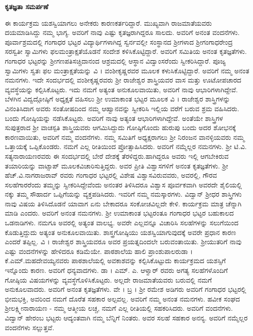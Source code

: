 {{\large \textbf{ಕೃತಜ್ಞತಾ ಸಮರ್ಪಣೆ \enginline{-}}}

ಈ ಕಾರ್ಯಕ್ರಮ ಯಶಸ್ವಿಯಾಗಲು  ಅನೇಕರು ಕಾರಣಕರ್ತರಿದ್ದಾರೆ. ಮುಖ್ಯವಾಗಿ ರಾಜಮಾತೆಯವರು ದಯಮಾಡಿಸಿದ್ದು ನಮ್ಮ ಭಾಗ್ಯ. ಅವರಿಗೆ ನಾವು ಎಷ್ಟು ಕೃತಜ್ಞರಾಗಿದ್ದರೂ ಸಾಲದು. ಅವರಿಗೆ ಅನಂತ ವಂದನೆಗಳು.
ಪೂರ್ವಾಶ್ರಮದಲ್ಲಿ ಗಂಗಾಧರ ಭಟ್ಟರ ವಿದ್ಯಾರ್ಥಿಗಳಾಗಿದ್ದ ಸ್ವರ್ನವಲ್ಲೀ ಸಂಸ್ಥಾನದ ಶ್ರೀಗಳಾದ \hbox{ಶ್ರೀಗಂಗಾಧರೇಂದ್ರ} ಸರಸ್ವತೀ ಸ್ವಾಮಿಗಳು ಫಲಮಂತ್ರಾಕ್ಷತೆಯೊಡನೆ ಸಂದೇಶ ಕಳಿಸಿಕೊಟ್ಟಿದ್ದಾರೆ. ಅವರಿಗೆ ಸಮಿತಿಯ ಅನಂತ ಕೃತಜ್ಞತೆಗಳು. ಗಂಗಾಧರ ಭಟ್ಟರನ್ನು ಶ್ರೀಗಣಪತಿಸಚ್ಚಿದಾನಂದ ಆಶ್ರಮ\-ದಲ್ಲಿ ಆಸ್ಥಾನ ವಿದ್ವಾಂಸರೆಂದು ಸ್ವೀಕರಿಸಿದ್ದಾರೆ. ಪೂಜ್ಯ ಸ್ವಾಮಿಗಳು ಸ್ವತಃ ಫಲ ಮಂತ್ರಾಕ್ಷತೆಯನ್ನು ವಿ । ವಂಶೀಕೃಷ್ಣರವರ ಮೂಲಕ ಕಳುಸಿಕೊಟ್ಟಿದ್ದಾರೆ. ಅವರಿಗೆ ನಮ್ಮ ಅನಂತ ನಮನಗಳು. ಇದೇ ಸಂದರ್ಭದಲ್ಲಿ ವಂಶೀಕೃಷ್ಣರವರು  ಶ್ರೀ ರಾಜೇಶ್ವರ ಶಾಸ್ತ್ರಿಯವರ ವಾಸ ಮತ್ತು ಊಟೋಪಚಾರದ ವ್ಯವಸ್ಥೆಯನ್ನು ಕಲ್ಪಿಸಿಕೊಟ್ಟರು. ಇದು ನಮಗೆ ಅತ್ಯಂತ ಅನುಕೂಲ\-ವಾಯಿತು, ಅವರಿಗೆ ನಾವು ಆಭಾರಿಗಳಾಗಿದ್ದೇವೆ. ಬೆಳಗಿನ ವಿದ್ವದ್ಗೋಷ್ಠಿಗೆ ಅಧ್ಯಕ್ಷತೆ ವಹಿಸಲು  ಶ್ರೀ ಉಮಾಕಾಂತ ಭಟ್ಟರ ಮೂಲಕ ವಿ । ರಾಜೇಶ್ವರ ಶಾಸ್ತ್ರಿಗಳನ್ನು ವಿನಂತಿಸಿದಾಗ ಅವರು ಸಂತೋಷದಿಂದ ನಮ್ಮ ಆಹ್ವಾನವನ್ನು ಸ್ವೀಕರಿಸಿ ಇಲ್ಲಿಯ ವರೆಗೆ ಬರುವ ಶ್ರಮ ವಹಿಸಿದರು. ಬಂದು ಗೋಷ್ಠಿಯನ್ನು ನಡೆಸಿಕೊಟ್ಟರು. ಅವರಿಗೆ ನಾವು ಅತ್ಯಂತ ಆಭಾರಿಗಳಾಗಿದ್ದೇವೆ. ಅಂತೆಯೇ ಶಾಸ್ತ್ರಿಗಳ ಸುಪುತ್ರರಾದ ಶ್ರೀ ವಾಚಸ್ಪತಿ ಶಾಸ್ತ್ರಿಯವರು  ಆಗಮಿಸಿದ್ದುದು ಗೋಷ್ಠಿಗೊಂದು  ಹುರುಪು ಬಂದು ಅದರ  \hbox{ಶೋಭನಕ್ಕೆ} ಕಾರಣವಾಯಿತು, ಅವರಿಗೆ ನಮ್ಮ ವಂದನೆಗಳು. ನಮ್ಮ ಸಮಿತಿಗೆ ಅಧ್ಯಕ್ಷರಾಗಲು ಶ್ರೀ ನಿರಂಜನ ವಾನಳ್ಳಿಯವರು ನಮ್ಮ ಒತ್ತಾಯಕ್ಕೆ ಒಪ್ಪಿಕೊಂಡರು.  ನಮಗೆ ಎಲ್ಲ ರೀತಿಯಿಂದ ಪ್ರೋತ್ಸಾಹಿಸಿದರು. ಅವರಿಗೆ ನಮ್ಮೆಲ್ಲರ ನಮನಗಳು. ಶ್ರೀ ಟಿ.ವಿ. ಸತ್ಯನಾರಾಯಣರವರು ಈ  ಸಂದರ್ಭದಲ್ಲಿ ಬೇರೆ ದೇಶಕ್ಕೆ ತೆರಳಿದ್ದರು.\break ಹಾಗಿದ್ದರೂ ಅವರು ಇಲ್ಲಿ ಆಗಬೇಕಿರುವ ತಯಾರಿಯನ್ನು ವಾಟ್ಸಾಪ್ ಮೂಲಕ\break ವಿಚಾರಿಸುತ್ತಿದ್ದರು. ಅವರ ಪ್ರೀತಿ ವಿಶ್ವಾಸಗಳಿಗೆ ಅನಂತ ಕೃತಜ್ಞತೆಗಳು. ಶ್ರೀ \hbox{ಹೆಚ್}.ವಿ.\-ನಾಗರಾಜರಾವ್ ರವರು ಗಂಗಾಧರ ಭಟ್ಟರಲ್ಲಿ ವಿಶೇಷ ವಿಶ್ವಾಸವಿರುವವರು, ಅವರಲ್ಲಿ, ಗೌರವ ಸಲಹೆಗಾರರೆಂದು ತಮ್ಮನ್ನು  ಸ್ವೀಕರಿಸಿದ್ದೇವೆಂದು ಅನಂತರ \hbox{ತಿಳಿಸಿದರೂ} ವಿಶ್ವಾಸ ಪೂರ್ವಕವಾಗಿ ಅವರದೇ ಶೈಲಿಯಲ್ಲಿ ನಕ್ಕು ತಮ್ಮ ಸೌಹಾರ್ದ ಒಪ್ಪಿಗೆಯನ್ನು ವ್ಯಕ್ತಪಡಿಸಿದರು. ಇವರಿಗೆ ನಮ್ಮ ನಮಸ್ಕಾರಗಳು. ವಿದ್ವಾನ್ ಶ್ರೀಧರ ಶಾಸ್ತ್ರಿಗಳು ನಾವು ವಿಷಯ ತಿಳಿಸಿದೊಡನೆ ಯಾವಾಗ ಏನು ಬೇಕಾದರೂ ಸಂಕೋಚವಿಲ್ಲದೇ ಕೇಳಿ. ಕಾರ್ಯಕ್ರಮ ಮಾತ್ರ ಚೆನ್ನಾಗಿ ಮಾಡಿ ಎಂದರು. ಅವರಿಗೆ ಅನಂತ ನಮನ\-ಗಳು. ಶ್ರೀ ಉಮಾಕಾಂತ ಭಟ್ಟರಂತೂ ಗಂಗಾಧರ ಭಟ್ಟರ ಬಹುಕಾಲದ ಒಡನಾಡಿಗಳು. ನಮಗೂ ಅವರಲ್ಲಿ ಅತ್ಯಂತ ವಾಲಭ್ಯ. ಅವರೇ ಎಲ್ಲವನ್ನೂ ವಿಚಾರಿಸಿ ಸಲಹೆಗಳನ್ನು ಸಲುಗೆಯಿಂದ ಕೊಡುತ್ತಿದ್ದುದು ಅತ್ಯಂತ ಅನುಕೂಲ\-ವಾಯಿತು. ಶಾಸ್ತ್ರಗೋಷ್ಠಿಯು ಯಶಸ್ವಿಯಾಗುವುದಕ್ಕೆ ಅವರೇ ಪ್ರಧಾನ ಕಾರಣ ಎಂದರೆ ತಪ್ಪಿಲ್ಲ. ವಿ । ರಾಜೇಶ್ವರ ಶಾಸ್ತ್ರಿಯವರೂ ಅವರ ಪ್ರಯತ್ನದಿಂದಲೇ ಬರುವಂತಾಯಿತು. ಶ್ರೀಯುತರಿಗೆ ನಾವು ಎಷ್ಟು ವಂದನೆಗಳನ್ನು ಹೇಳಿದರೂ ಕಡಿಮೆಯೇ. ಪಾಠಶಾಲೆಯ ಹಾಲಿ ಪ್ರಾಂಶುಪಾಲರು\break ಡಾ । ಕೆ.ಎಮ್.ಮಹದೇವಯ್ಯನವರು ಪಾಠಶಾಲೆಯಲ್ಲಿ ಅವಕಾಶವನ್ನು ಕಲ್ಪಿಸಿ\-ಕೊಟ್ಟುದು ಕಾರ್ಯಕ್ರಮದ ಯಶಸ್ಸಿಗೆ ಇನ್ನೊಂದು ಕಾರಣ. ಅವರಿಗೆ \hbox{ಧನ್ಯವಾದಗಳು.} ಡಾ । ಎಮ್. ಎ. ಆಳ್ವಾರ್ ರವರು ಅಗತ್ಯ ಸಲಹೆಗಳೊಂದಿಗೆ ಗೋಷ್ಠಿಯ ವಿಷಯಗಳನ್ನು ವ್ಯವಸ್ಥೆಗೊಳಿಸಿಕೊಟ್ಟರು. ಅಲ್ಲದೇ ರಾಜಮಾತೆಯವರು ಬರುವಲ್ಲಿ ನಮಗೆ ಅನುಕೂಲವಾದರು. ಅವರಿಗೆ ಅನಂತ ಕೃತಜ್ಞತೆಗಳು. ವೇ । ಬ್ರ । ಶ್ರೀ ರಮೇಶ ಅಡಿಗರು \enginline{-} ಅವರಿಗೆ ಗಂಗಾಧರ ಭಟ್ಟರಲ್ಲಿ ಭೀಮಭಕ್ತಿ, ಅವರಿಂದ ನಮಗೆ ದೊರೆತ ಸಹಕಾರ ಅಲ್ಪವಲ್ಲ. ಅವರಿಗೆ ನಮ್ಮ ಅನಂತ ನಮನಗಳು. ಹವೀಕ ಸಂಘದ ಶ್ರೀಲಕ್ಷ್ಮೀನಾರಾಯಣ - ನಮ್ಮ ಆತ್ಮೀಯ ಲಚ್ಚ, ನಮಗೆ ಎಲ್ಲ ರೀತಿಯಲ್ಲಿ ಸಹಕರಿಸಿದರು. ಅವರಿಗೆ ವಂದನೆಗಳು. ವಿದ್ವಾನ್ ಹೇರಂಬ ಭಟ್ಟರು ಆದ್ಯಂತವಾಗಿ ನಮ್ಮ ಬೆನ್ನಿಗೆ ನಿಂತರು. ಅವರ ಸಲಹೆ ಸಹಕಾರ ಅನನ್ಯ. ಅವರಿಗೆ ನಮ್ಮೆಲ್ಲರ ವಂದನೆಗಳು ಸಲ್ಲುತ್ತವೆ.

}

